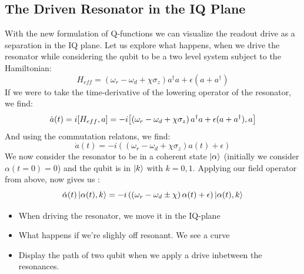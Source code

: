 \subsection{The Driven Resonator in the IQ Plane}\label{sec:driving_resonator_iq_plane}
With the new formulation of Q-functions we can visualize the readout drive as a separation in the IQ plane. Let us explore what happens, when we drive the resonator while considering the qubit to be a two level system subject to the Hamiltonian:
\begin{equation}
    H_{eff} =  \left(\omega_r - \omega_d + \chi \sigma_z\right)a^\dagger a + \epsilon(a + a^\dagger)
\end{equation}
If we were to take the time-derivative of the lowering operator of the resonator, we find:
\begin{equation}
    \dot{a}(t) = i\comm{H_{eff}}{a} = -i\comm{\left(\omega_r - \omega_d + \chi \sigma_z\right)a^\dagger a + \epsilon(a + a^\dagger)}{a}
\end{equation}
And using the commutation relatons, we find:
\begin{equation}
    \dot{a}(t) = -i \left(\left(\omega_r - \omega_d + \chi \sigma_z\right) a(t) + \epsilon\right)
\end{equation}
We now consider the resonator to be in a coherent state $\ket{\alpha}$ (initially we consider $\alpha(t=0) = 0$) and the qubit is in $\ket{k}$ with $k = 0,  1$. Applying our field operator from above, now gives us \cite{blais_circuit_2021}:
\begin{equation}
    \dot{\alpha}(t) \ket{\alpha(t), k} = - i \left(\left(\omega_r - \omega_d \pm \chi \right) \alpha(t) + \epsilon\right) \ket{\alpha(t), k} 
\end{equation}


\begin{itemize}
    \item When driving the resonator, we move it in the IQ-plane
    \item What happens if we're slighly off resonant. We see a curve
    \item Display the path of two qubit when we apply a drive inbetween the resonances. 
\end{itemize}


